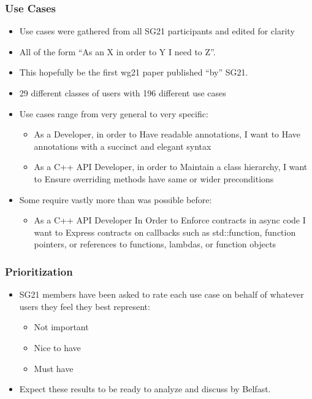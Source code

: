 \begin{frame}
  \frametitle{Use Cases}

  \begin{itemize}
  \item Use cases were gathered from all SG21 participants and edited for clarity \pause
  \item All of the form ``As an X in order to Y I need to Z''. \pause
  \item This hopefully be the first wg21 paper published ``by'' SG21. \pause
  \item 29 different classes of users with 196 different use cases \pause
  \item Use cases range from very general to very specific: \pause
    \begin{itemize}
    \item As a Developer, in order to Have readable annotations, I want to Have annotations with a succinct and elegant syntax \pause
    \item As a C++ API Developer, in order to Maintain a class hierarchy, I want to Ensure overriding methods have same or wider preconditions \pause
    \end{itemize}
  \item Some require vastly more than was possible before: \pause
    \begin{itemize}
    \item As a C++ API Developer  In Order to Enforce contracts in async code I want to Express contracts on callbacks such as std::function, function pointers, or references to functions, lambdas, or function objects
    \end{itemize}
  \end{itemize}

\end{frame}

\begin{frame}
  \frametitle{Prioritization}
  \begin{itemize}
  \item SG21 members have been asked to rate each use case on behalf of whatever users they feel they best represent:
    \begin{itemize}
    \item Not important
    \item Nice to have
    \item Must have \pause
    \end{itemize}
  \item Expect these results to be ready to analyze and discuss by Belfast.
  \end{itemize}
\end{frame}

